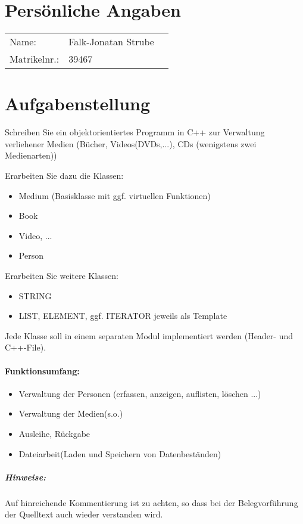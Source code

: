 

\DNotiz{}
\renewcommand{\workingdir}{../../}
\renewcommand{\Dokumentensignatur}{}
\renewcommand{\Autorformat}[1]{\textcolor{darkgray}{#1}}



\maketitle
\newpage

\section*{Persönliche Angaben}
\begin{tabular}{l l l}
Name: 					&Falk-Jonatan Strube\\
Matrikelnr.:		&39467\\
\end{tabular}

\section*{Aufgabenstellung}
Schreiben Sie ein objektorientiertes Programm in C++ zur Verwaltung verliehener Medien (Bücher, Videos(DVDs,...), CDs (wenigstens zwei Medienarten))

Erarbeiten Sie dazu die Klassen:
\begin{itemize}
\item Medium (Basisklasse mit ggf. virtuellen Funktionen)
\item Book
\item Video, ...
\item Person
\end{itemize}
Erarbeiten Sie weitere Klassen:
\begin{itemize}
\item STRING
\item LIST, ELEMENT, ggf. ITERATOR jeweils als Template
\end{itemize}
Jede Klasse soll in einem separaten Modul implementiert werden (Header- und C++-File).

\paragraph{Funktionsumfang:}
\begin{itemize}
\item Verwaltung der Personen (erfassen, anzeigen, auflisten, löschen ...)
\item Verwaltung der Medien(s.o.)
\item Ausleihe, Rückgabe
\item Dateiarbeit(Laden und Speichern von Datenbeständen)
\end{itemize}
\subparagraph{Hinweise:}
Auf hinreichende Kommentierung ist zu achten, so dass bei der Belegvorführung der Quelltext auch wieder verstanden wird.

